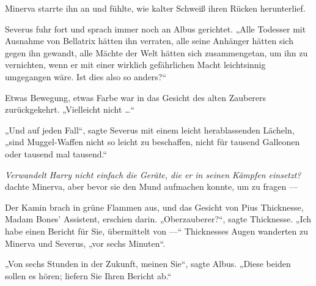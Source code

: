 Minerva starrte ihn an und fühlte, wie kalter Schweiß ihren Rücken herunterlief.

Severus fuhr fort und sprach immer noch an Albus gerichtet.
„Alle Todesser mit Ausnahme von Bellatrix hätten ihn verraten, alle seine Anhänger hätten sich gegen ihn gewandt, alle Mächte der Welt hätten sich zusammengetan, um ihn zu vernichten, wenn er mit einer wirklich gefährlichen Macht leichtsinnig umgegangen wäre. Ist dies also so anders?“

Etwas Bewegung, etwas Farbe war in das Gesicht des alten Zauberers zurückgekehrt.
„Vielleicht nicht …“

„Und auf jeden Fall“, sagte Severus mit einem leicht herablassenden Lächeln, „sind Muggel-Waffen nicht so leicht zu beschaffen, nicht für tausend Galleonen oder tausend mal tausend.“

\emph{Verwandelt Harry nicht einfach die Geräte, die er in seinen Kämpfen einsetzt?} dachte Minerva, aber bevor sie den Mund aufmachen konnte, um zu fragen —

Der Kamin brach in grüne Flammen aus, und das Gesicht von Pius Thicknesse, Madam Bones’ Assistent, erschien darin.
„Oberzauberer?“, sagte Thicknesse.
„Ich habe einen Bericht für Sie, übermittelt von —“ Thicknesses Augen wanderten zu Minerva und Severus, „vor sechs Minuten“.

„Von sechs Stunden in der Zukunft, meinen Sie“, sagte Albus.
„Diese beiden sollen es hören; liefern Sie Ihren Bericht ab.“

